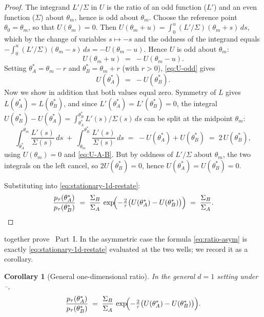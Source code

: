 \documentclass[11pt,a4paper]{article}
\newtheorem{corollary}[theorem]{Corollary}
\theoremstyle{definition}
\theoremstyle{remark}
\begin{document}
\begin{proof}
   The integrand $L'/\Sigma$ in $U$ is the ratio of an odd function ($L'$)
   and an even function ($\Sigma$) about $\theta_m$, hence is odd about
   $\theta_m$.  Choose the reference point $\theta_0=\theta_m$, so that
   $U(\theta_m) = 0$.  Then $U(\theta_m+u) = \int_0^u (L'/\Sigma)(\theta_m
   + s)\,ds$, which by the change of variables $s\mapsto -s$ and the
   oddness of the integrand equals $-\int_0^u (L'/\Sigma)(\theta_m -
   s)\,ds = -U(\theta_m - u)$.  Hence $U$ is odd about $\theta_m$:
   \begin{equation}\label{eq:U-odd}
      U(\theta_m+u) \;=\; -U(\theta_m-u).
   \end{equation}
   Setting $\theta_A^* = \theta_m - r$ and $\theta_B^* = \theta_m + r$
   (with $r>0$), \eqref{eq:U-odd} gives
   \begin{equation}\label{eq:U-A-B}
      U(\theta_A^*) \;=\; -U(\theta_B^*).
   \end{equation}
   Now we show in addition that both values equal zero.  Symmetry of $L$
   gives $L(\theta_A^*) = L(\theta_B^*)$, and since $L'(\theta_A^*) =
   L'(\theta_B^*) = 0$, the integral $U(\theta_B^*) - U(\theta_A^*) =
   \int_{\theta_A^*}^{\theta_B^*} L'(s)/\Sigma(s)\,ds$ can be split at the
   midpoint $\theta_m$:
   \[
      \int_{\theta_A^*}^{\theta_m} \frac{L'(s)}{\Sigma(s)}\,ds
      \;+\;
      \int_{\theta_m}^{\theta_B^*} \frac{L'(s)}{\Sigma(s)}\,ds
      \;=\; -U(\theta_A^*) + U(\theta_B^*)
      \;=\; 2\,U(\theta_B^*),
   \]
   using $U(\theta_m)=0$ and \eqref{eq:U-A-B}.  But by oddness of
   $L'/\Sigma$ about $\theta_m$, the two integrals on the left cancel,
   so $2U(\theta_B^*) = 0$, hence $U(\theta_A^*) = U(\theta_B^*) = 0$.

   Substituting into \eqref{eq:stationary-1d-restate}:
   \[
      \frac{p_\tau(\theta_A^*)}{p_\tau(\theta_B^*)}
      \;=\; \frac{\Sigma_B}{\Sigma_A}\,
            \exp\!\Bigl(-\tfrac{2}{\tau}\bigl(U(\theta_A^*)
                                              -U(\theta_B^*)\bigr)\Bigr)
      \;=\; \frac{\Sigma_B}{\Sigma_A}.
   \]
\end{proof}

 together prove
~Part~I.  In the asymmetric case the formula
\eqref{eq:ratio-asym} is exactly \eqref{eq:stationary-1d-restate} evaluated
at the two wells; we record it as a corollary.

\begin{corollary}[General one-dimensional ratio]\label{cor:ratio-1d-gen}
   In the general $d=1$ setting under --,
   \[
      \frac{p_\tau(\theta_A^*)}{p_\tau(\theta_B^*)}
      \;=\; \frac{\Sigma_B}{\Sigma_A}\,
            \exp\!\Bigl(-\tfrac{2}{\tau}\bigl(U(\theta_A^*)
                                                - U(\theta_B^*)\bigr)\Bigr).
   \]
\end{corollary}
\end{document}
